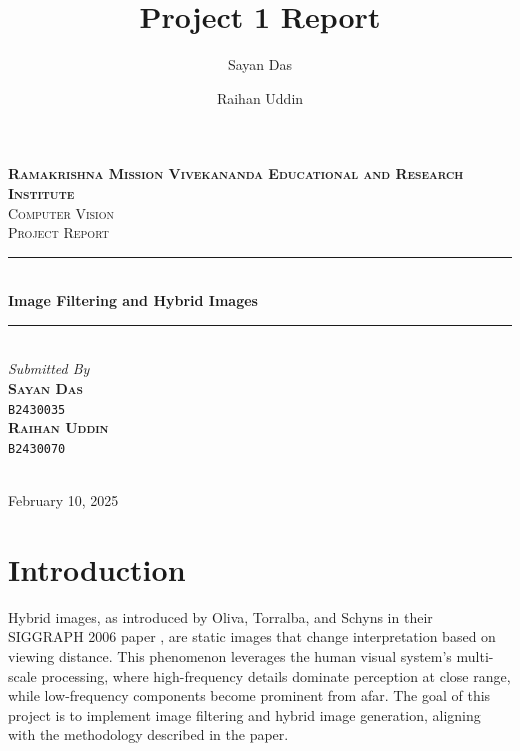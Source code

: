 \documentclass[12pt]{report}
\title{Project 1 Report}
\author{
  Sayan Das
  \and
  Raihan Uddin
}
\begin{document}
\begin{titlepage}
	\newcommand{\HRule}{\rule{\linewidth}{0.5mm}}
	\center


	\textsc{\LARGE \textbf{Ramakrishna Mission Vivekananda Educational and Research Institute}}\\[1.5cm]

	\textsc{\LARGE Computer Vision}\\[0.5cm]

	\textsc{\large Project Report}\\[0.5cm]

	\HRule\\[0.4cm]

	{\huge\bfseries Image Filtering and Hybrid Images}\\[0.4cm]

	\HRule\\[1.5cm]



\large
\textit{Submitted By}\\
\textsc{\textbf{Sayan Das }}\\
\vspace{-0.5em}
\textsc{\texttt{B2430035 }}\\
\textsc{\textbf{Raihan Uddin }}\\
\vspace{-0.5em}
\textsc{\texttt{B2430070} }\\

	~
	\begin{minipage}{0.4\textwidth}
	\end{minipage}


	\vfill\vfill\vfill

	{\large February 10, 2025}

	\vfill

\end{titlepage}
\restoregeometry

\tableofcontents

\chapter{Introduction}
Hybrid images, as introduced by Oliva, Torralba, and Schyns in their SIGGRAPH 2006 paper \cite{oliva2006}, are static images that change interpretation based on viewing distance. This phenomenon leverages the human visual system's multi-scale processing, where high-frequency details dominate perception at close range, while low-frequency components become prominent from afar. The goal of this project is to implement image filtering and hybrid image generation, aligning with the methodology described in the paper.
\end{document}
